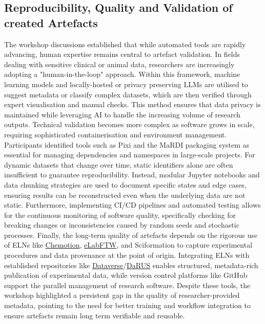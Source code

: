 \documentclass{eceasst}
\newcommand{\elabftw}{\href{https://www.elabftw.net/}{eLabFTW}}
\begin{document}
\subsection{Reproducibility, Quality and Validation of created Artefacts}
The workshop discussions established that while automated tools are rapidly advancing, human expertise remains central to artefact validation.
In fields dealing with sensitive clinical or animal data, researchers are increasingly adopting a "human-in-the-loop" approach.
Within this framework, machine learning models and locally-hosted or privacy preserving LLMs are utilised to suggest metadata or classify complex datasets, which are then verified through expert visualisation and manual checks.
This method ensures that data privacy is maintained while leveraging AI to handle the increasing volume of research outputs.
Technical validation becomes more complex as software grows in scale, requiring sophisticated containerisation and environment management.
Participants identified tools such as Pixi and the MaRDI packaging system as essential for managing dependencies and namespaces in large-scale projects.
For dynamic datasets that change over time, static identifiers alone are often insufficient to guarantee reproducibility.
Instead, modular Jupyter notebooks and data chunking strategies are used to document specific states and edge cases, ensuring results can be reconstructed even when the underlying data are not static.
Furthermore, implementing CI/CD pipelines and automated testing allows for the continuous monitoring of software quality, specifically checking for breaking changes or inconsistencies caused by random seeds and stochastic processes.
Finally, the long-term quality of artefacts depends on the rigorous use of ELNs like \href{https://chemotion.net/}{Chemotion}, \elabftw, and Sciformation to capture  experimental procedures and data provenance at the point of origin.
Integrating ELNs with established repositories like \href{https://dataverse.org/}{Dataverse}/\href{https://darus.uni-stuttgart.de/dataverse/darus}{DaRUS} enables structured, metadata-rich publication of experimental data, while version control platforms like GitHub support the parallel management of research software.
Despite these tools, the workshop highlighted a persistent gap in the quality of researcher-provided metadata, pointing to the need for better training and workflow integration to ensure artefacts remain long term verifiable and reusable.
\end{document}
